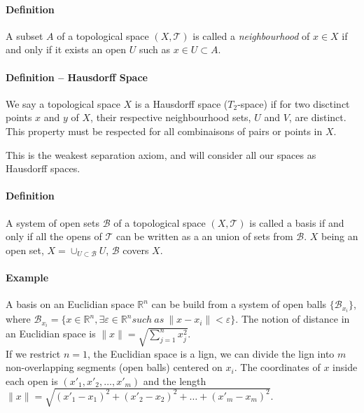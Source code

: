 \documentclass[final, paper=letter,5p,times,twocolumn]{elsarticle}
\theoremstyle{definition}
\begin{document}
\paragraph{Definition}{A subset $A$ of a topological space $(X,\mathcal{T})$ is called a {\it neighbourhood} of $x \in X$ if and only if it exists an open $U$ such as $x \in U \subset A$. \\
}

\paragraph{Definition -- Hausdorff Space}{We say a topological space $X$ is a Hausdorff space ($T_{2}$-space) if for two disctinct points $x$ and $y$ of $X$, their respective neighbourhood sets, $U$ and $V$, are distinct. This property must be respected for all combinaisons of pairs or points in $X$.\\
}

This is the weakest separation axiom, and will consider all our spaces as Hausdorff spaces.

\paragraph{Definition}{A system of open sets $\mathcal{B}$ of a topological space $(X,\mathcal{T})$ is called a basis if and only if all the opens of $\mathcal{T}$ can be written as a an union of sets from $\mathcal{B}$. $X$ being an open set, $X = \cup_{U \subset \mathcal{B}}U$, $\mathcal{B}$ covers $X$.}

\paragraph{Example}{A basis on an Euclidian space $\mathbb{R}^{n}$ can be build from a system of open balls $\{\mathcal{B}_{x_{i}}\}$, where $\mathcal{B}_{x_{i}} = \{x \in \mathbb{R}^{n}, \exists \varepsilon \in \mathbb{R}^{n} such~as~ \|x-x_{i}\| < \varepsilon \}$. The notion of distance in an Euclidian space is $\|x\| = \sqrt{\sum_{j=1}^{n} x_{j}^{2}}$.\\

  If we restrict $n=1$, the Euclidian space is a lign, we can divide the lign into $m$ non-overlapping segments (open balls) centered on $x_{i}$. The coordinates of $x$ inside each open is $(x'_{1}, x'_{2}, \dots,x'_{m})$ and the length $\|x\| = \sqrt{(x'_{1}-x_{1})^{2} + (x'_{2}-x_{2})^{2} + \dots + (x'_{m}-x_{m})^{2}}$.\\
}
\end{document}
